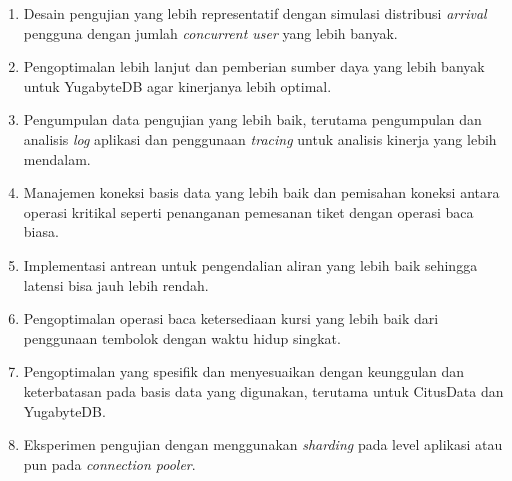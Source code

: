 \begin{enumerate}
    \item Desain pengujian yang lebih representatif dengan simulasi distribusi \textit{arrival} pengguna dengan jumlah \textit{concurrent user} yang lebih banyak.
    \item Pengoptimalan lebih lanjut dan pemberian sumber daya yang lebih banyak untuk YugabyteDB agar kinerjanya lebih optimal.
    \item Pengumpulan data pengujian yang lebih baik, terutama pengumpulan dan analisis \textit{log} aplikasi dan penggunaan \textit{tracing} untuk analisis kinerja yang lebih mendalam.
    \item Manajemen koneksi basis data yang lebih baik dan pemisahan koneksi antara operasi kritikal seperti penanganan pemesanan tiket dengan operasi baca biasa.
    \item Implementasi antrean untuk pengendalian aliran yang lebih baik sehingga latensi bisa jauh lebih rendah.
    \item Pengoptimalan operasi baca ketersediaan kursi yang lebih baik dari penggunaan tembolok dengan waktu hidup singkat.
    \item Pengoptimalan yang spesifik dan menyesuaikan dengan keunggulan dan keterbatasan pada basis data yang digunakan, terutama untuk CitusData dan YugabyteDB.
    \item Eksperimen pengujian dengan menggunakan \textit{sharding} pada level aplikasi atau pun pada \textit{connection pooler}.
\end{enumerate}